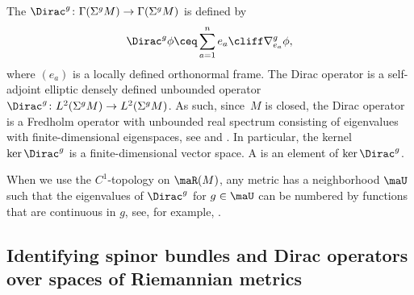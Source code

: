 The  $\Dirac^g\colon \Gamma(\Sigma^gM)\to \Gamma(\Sigma^gM)$ is defined by
\[
\Dirac^g \phi \ceq \sum_{a=1}^n e_a \cliff \nabla^g_{e_a} \phi,
\]
where $(e_a)$ is a locally defined orthonormal frame.
The Dirac operator is a self-adjoint elliptic densely defined unbounded operator $\Dirac^g \colon L^2(\Sigma^g M) \to L^2(\Sigma^g M)$.
As such, since~$M$ is closed, the Dirac operator is a Fredholm operator with unbounded real spectrum consisting of eigenvalues with finite-dimensional eigenspaces, see \cite[Chapter~III, Section~5]{lawson.michelsohn:89} and \cite[Section~4]{friedrich-book}. In particular, the kernel $\ker\Dirac^g$ is a finite-dimensional vector space. A  is an element of $\ker\Dirac^g$.

When we use the $C^1$-topology on $\maR(M)$, any metric has a neighborhood $\maU$ such that the eigenvalues
of $\Dirac^g$ for $g\in \maU$ can be numbered by functions that are continuous in $g$, see, for example, \cite{nowaczyk:continuity}.



\subsection[Identifying spinor bundles and Dirac operators over spaces of Riemannian metrics]{Identifying spinor bundles and Dirac operators\\ over spaces of Riemannian metrics} %

